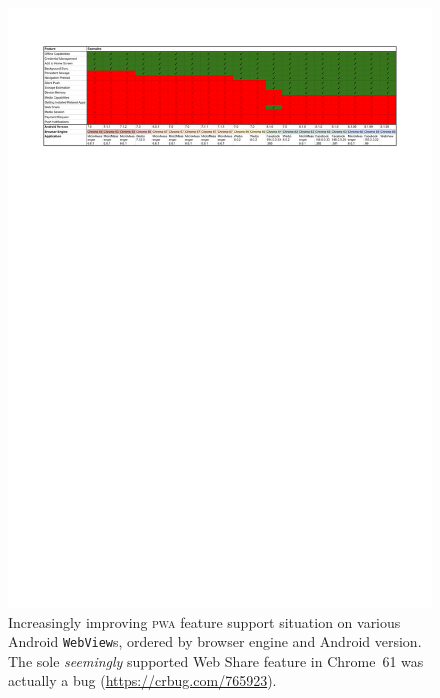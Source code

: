 \documentclass[sigconf]{acmart}
\begin{document}
\begin{figure}[htb]
  \setcounter{figure}{0}
  \renewcommand{\figurename}{Table}
  \begin{center}
  \centerline{\includegraphics[trim=1.5cm 22.75cm 1.5cm 1.5cm, clip]{webview-results.pdf}}
  \caption{Increasingly improving \textsc{pwa} feature support situation
    on various Android \texttt{WebView}s, ordered by browser engine and Android version.
    The sole \emph{seemingly} supported Web Share feature in Chrome~61
    was actually a bug (\url{https://crbug.com/765923}).}
  \label{table:webview}
  \end{center}
\end{figure}
\end{document}
